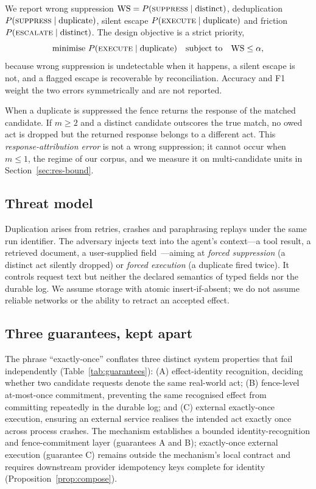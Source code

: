 We report wrong suppression $\mathrm{WS}=P(\textsc{suppress}\mid\text{distinct})$, deduplication $P(\textsc{suppress}\mid\text{duplicate})$, silent escape $P(\textsc{execute}\mid\text{duplicate})$ and friction $P(\textsc{escalate}\mid\text{distinct})$. The design objective is a strict priority,
\begin{equation}\label{eq:objective}
\text{minimise } P(\textsc{execute}\mid\text{duplicate}) \quad\text{subject to}\quad \mathrm{WS}\le\alpha ,
\end{equation}
because wrong suppression is undetectable when it happens, a silent escape is not, and a flagged escape is recoverable by reconciliation. Accuracy and F1 weight the two errors symmetrically and are not reported.

When a duplicate is suppressed the fence returns the response of the matched candidate. If $m\ge2$ and a distinct candidate outscores the true match, no owed act is dropped but the returned response belongs to a different act. This \emph{response-attribution error} is not a wrong suppression; it cannot occur when $m\le1$, the regime of our corpus, and we measure it on multi-candidate units in Section~\ref{sec:res-bound}.

\subsection{Threat model}\label{sec:threat}

Duplication arises from retries, crashes and paraphrasing replays under the same run identifier. The adversary injects text into the agent's context---a tool result, a retrieved document, a user-supplied field~\cite{greshake2023injection}---aiming at \emph{forced suppression} (a distinct act silently dropped) or \emph{forced execution} (a duplicate fired twice). It controls request text but neither the declared semantics of typed fields nor the durable log. We assume storage with atomic insert-if-absent; we do not assume reliable networks or the ability to retract an accepted effect.

\subsection{Three guarantees, kept apart}\label{sec:guarantees}

The phrase ``exactly-once'' conflates three distinct system properties that fail independently (Table~\ref{tab:guarantees}): (A) effect-identity recognition, deciding whether two candidate requests denote the same real-world act; (B) fence-level at-most-once commitment, preventing the same recognised effect from committing repeatedly in the durable log; and (C) external exactly-once execution, ensuring an external service realises the intended act exactly once across process crashes. The mechanism establishes a bounded identity-recognition and fence-commitment layer (guarantees A and B); exactly-once external execution (guarantee C) remains outside the mechanism's local contract and requires downstream provider idempotency keys complete for identity (Proposition~\ref{prop:compose}).

